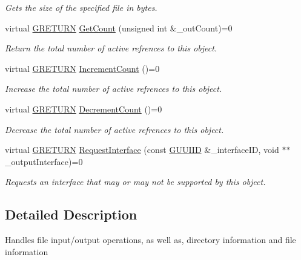 \begin{DoxyCompactItemize}
\begin{DoxyCompactList}\small\item\em Gets the size of the specified file in bytes. \end{DoxyCompactList}\item 
virtual \hyperlink{namespace_g_w_a69b1aaebac1cac8049825f035884c95b}{G\+R\+E\+T\+U\+RN} \hyperlink{class_g_w_1_1_c_o_r_e_1_1_g_interface_a80f212dcdf60202cf9da49405863d1d5}{Get\+Count} (unsigned int \&\+\_\+out\+Count)=0
\begin{DoxyCompactList}\small\item\em Return the total number of active refrences to this object. \end{DoxyCompactList}\item 
virtual \hyperlink{namespace_g_w_a69b1aaebac1cac8049825f035884c95b}{G\+R\+E\+T\+U\+RN} \hyperlink{class_g_w_1_1_c_o_r_e_1_1_g_interface_a3e04e58eef4f3e3f56ff7fb751194c37}{Increment\+Count} ()=0
\begin{DoxyCompactList}\small\item\em Increase the total number of active refrences to this object. \end{DoxyCompactList}\item 
virtual \hyperlink{namespace_g_w_a69b1aaebac1cac8049825f035884c95b}{G\+R\+E\+T\+U\+RN} \hyperlink{class_g_w_1_1_c_o_r_e_1_1_g_interface_af6924e12b14f217b518fc91c63d9703d}{Decrement\+Count} ()=0
\begin{DoxyCompactList}\small\item\em Decrease the total number of active refrences to this object. \end{DoxyCompactList}\item 
virtual \hyperlink{namespace_g_w_a69b1aaebac1cac8049825f035884c95b}{G\+R\+E\+T\+U\+RN} \hyperlink{class_g_w_1_1_c_o_r_e_1_1_g_interface_ab1414aa07bca310a824ee01a91657ad0}{Request\+Interface} (const \hyperlink{struct_g_w_1_1_g_u_u_i_i_d}{G\+U\+U\+I\+ID} \&\+\_\+interface\+ID, void $\ast$$\ast$\+\_\+output\+Interface)=0
\begin{DoxyCompactList}\small\item\em Requests an interface that may or may not be supported by this object. \end{DoxyCompactList}\end{DoxyCompactItemize}


\subsection{Detailed Description}
Handles file input/output operations, as well as, directory information and file information 


